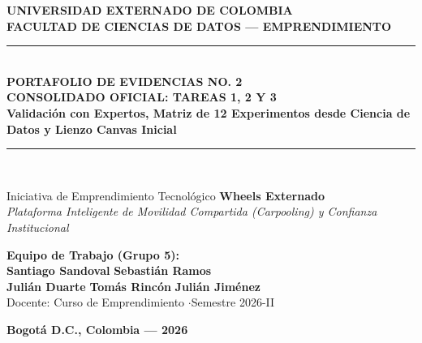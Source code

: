 \documentclass[11pt,a4paper]{article}
\begin{document}
\begin{titlepage}
    \centering
    \vspace*{0.5cm}
    {\Huge \textbf{\color{primary} UNIVERSIDAD EXTERNADO DE COLOMBIA}}\\[0.3cm]
    {\Large \textbf{\color{secondary} FACULTAD DE CIENCIAS DE DATOS --- EMPRENDIMIENTO}}\\[1.5cm]
    
    \rule{\linewidth}{0.8mm}\\[0.4cm]
    {\Huge \textbf{PORTAFOLIO DE EVIDENCIAS NO. 2}}\\[0.3cm]
    {\Large \textbf{CONSOLIDADO OFICIAL: TAREAS 1, 2 Y 3}}\\[0.3cm]
    {\large \textbf{Validación con Expertos, Matriz de 12 Experimentos desde Ciencia de Datos y Lienzo Canvas Inicial}}\\[0.4cm]
    \rule{\linewidth}{0.8mm}\\[1.2cm]
    
    \begin{externadobox}[colback=white,colframe=primary]{Iniciativa de Emprendimiento Tecnológico}
        \centering \vspace{0.2cm}
        {\Huge \textbf{\color{primary} Wheels Externado}}\\[0.3cm]
        {\large \textit{Plataforma Inteligente de Movilidad Compartida (Carpooling) y Confianza Institucional}}\\[0.2cm]
    \end{externadobox}
    
    \vfill
    
    \begin{minipage}{0.85\textwidth}
        \centering
        \textbf{\large Equipo de Trabajo (Grupo 5):}\\[0.3cm]
        \textbf{Santiago Sandoval} \quad\vert\quad \textbf{Sebastián Ramos}\\[0.15cm]
        \textbf{Julián Duarte} \quad\vert\quad \textbf{Tomás Rincón} \quad\vert\quad \textbf{Julián Jiménez}\\[0.4cm]
        {\small Docente: Curso de Emprendimiento \quad$\cdot$\quad Semestre 2026-II}
    \end{minipage}
    
    \vfill
    {\large \textbf{Bogotá D.C., Colombia --- 2026}}
\end{titlepage}
\end{document}
